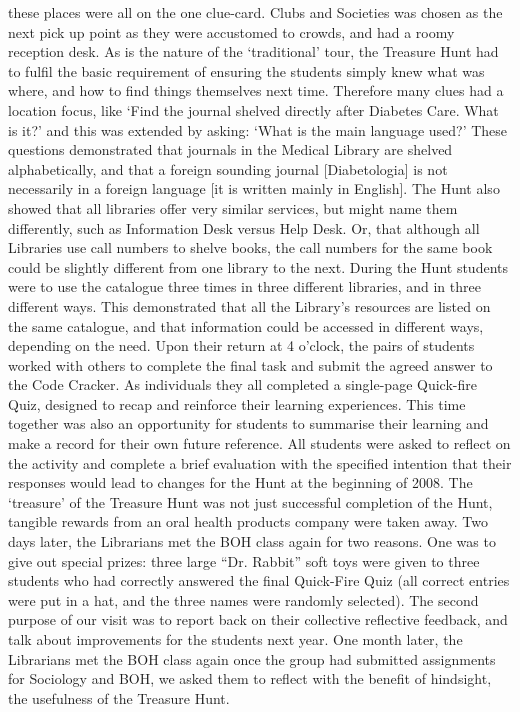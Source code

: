 these places were all on the one clue-card. Clubs and Societies was chosen as the next 
pick up point as they were accustomed to crowds, and had a roomy reception desk. 
As is the nature of the ‘traditional’ tour, the Treasure Hunt had to fulfil the basic 
requirement of ensuring the students simply knew what was where, and how to find things 
themselves next time. Therefore many clues had a location focus, like ‘Find the journal 
shelved directly after Diabetes Care. What is it?’ and this was extended by asking: ‘What is 
the main language used?’ These questions demonstrated that journals in the Medical 
Library are shelved alphabetically, and that a foreign sounding journal [Diabetologia] is not 
necessarily in a foreign language [it is written mainly in English]. The Hunt also showed 
that all libraries offer very similar services, but might name them differently, such as 
Information Desk versus Help Desk. Or, that although all Libraries use call numbers to 
shelve books, the call numbers for the same book could be slightly different from one 
library to the next. 
During the Hunt students were to use the catalogue three times in three different libraries, 
and in three different ways. This demonstrated that all the Library’s resources are listed 
on the same catalogue, and that information could be accessed in different ways, 
depending on the need. Upon their return at 4 o’clock, the pairs of students worked with others to complete the 
final task and submit the agreed answer to the Code Cracker. As individuals they all 
completed a single-page Quick-fire Quiz, designed to recap and reinforce their learning 
experiences. This time together was also an opportunity for students to summarise their 
learning and make a record for their own future reference. All students were asked to 
reflect on the activity and complete a brief evaluation with the specified intention that their 
responses would lead to changes for the Hunt at the beginning of 2008. The ‘treasure’ of 
the Treasure Hunt was not just successful completion of the Hunt, tangible rewards from 
an oral health products company were taken away. 
Two days later, the Librarians met the BOH class again for two reasons. One was to give 
out special prizes: three large “Dr. Rabbit” soft toys were given to three students who had 
correctly answered the final Quick-Fire Quiz (all correct entries were put in a hat, and the 
three names were randomly selected). The second purpose of our visit was to report back 
on their collective reflective feedback, and talk about improvements for the students next 
year. One month later, the Librarians met the BOH class again once the group had 
submitted assignments for Sociology and BOH, we asked them to reflect with the benefit 
of hindsight, the usefulness of the Treasure Hunt. 

